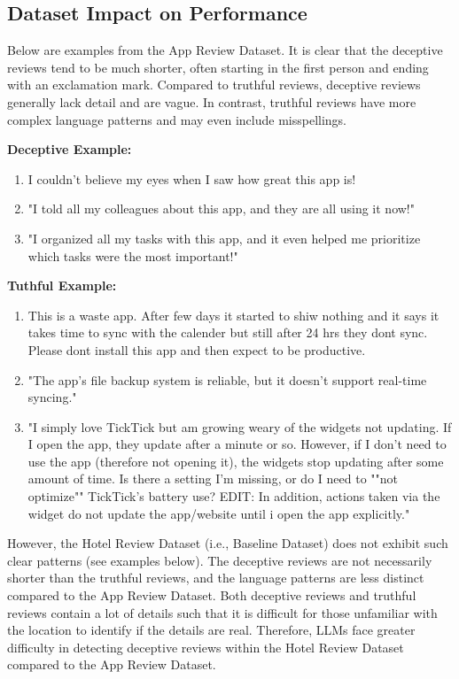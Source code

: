 \documentclass[sigconf, nonacm]{acmart}
\newenvironment{example}
{\begin{mdframed}[
    linecolor=exampleborder,
    linewidth=0.5pt,
    backgroundcolor=examplecolor,
    topline=false,
    bottomline=false,
    leftline=true,
    rightline=false,
    innertopmargin=2pt,
    innerbottommargin=2pt,
    innerleftmargin=5pt,
    innerrightmargin=5pt,
    skipabove=10pt,
    skipbelow=10pt
]}
{\end{mdframed}}
\theoremstyle{definition}
\begin{document}
\subsection{Dataset Impact on Performance}

Below are examples from the App Review Dataset. It is clear that the deceptive reviews tend to be much shorter, often starting in the first person and ending with an exclamation mark. Compared to truthful reviews, deceptive reviews generally lack detail and are vague. In contrast, truthful reviews have more complex language patterns and may even include misspellings.

\begin{example}
  \textbf{Deceptive Example:}
  \begin{enumerate}
    \item I couldn’t believe my eyes when I saw how great this app is!
    \item "I told all my colleagues about this app, and they are all using it now!"
    \item "I organized all my tasks with this app, and it even helped me prioritize which tasks were the most important!"
  \end{enumerate}
\end{example}

\begin{example}
  \textbf{Tuthful Example:}
  \begin{enumerate}
    \item This is a waste app. After few days it started to shiw nothing and it says it takes time to sync with the calender but still after 24 hrs they dont sync. Please dont install this app and then expect to be productive.
    \item "The app’s file backup system is reliable, but it doesn’t support real-time syncing."
    \item "I simply love TickTick but am growing weary of the widgets not updating. If I open the app, they update after a minute or so. However, if I don't need to use the app (therefore not opening it), the widgets stop updating after some amount of time. Is there a setting I'm missing, or do I need to ""not optimize"" TickTick's battery use? EDIT: In addition, actions taken via the widget do not update the app/website until i open the app explicitly."
  \end{enumerate}
\end{example}

However, the Hotel Review Dataset (i.e., Baseline Dataset) does not exhibit such clear patterns (see examples below). The deceptive reviews are not necessarily shorter than the truthful reviews, and the language patterns are less distinct compared to the App Review Dataset. Both deceptive reviews and truthful reviews contain a lot of details such that it is difficult for those unfamiliar with the location to identify if the details are real. Therefore, LLMs face greater difficulty in detecting deceptive reviews within the Hotel Review Dataset compared to the App Review Dataset.
\end{document}
